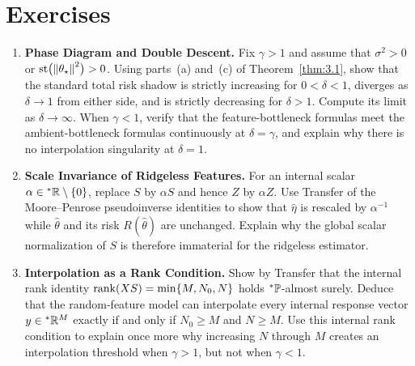 \section{Exercises}
\label{sec:3.4}

\begin{enumerate}
\item \textbf{Phase Diagram and Double Descent.} Fix $\gamma > 1$ and assume that $\sigma^2 > 0$ or $\operatorname{st}\bigl(\left\lVert \theta_\star \right\rVert^2\bigr) > 0$. Using parts~(a) and~(c) of Theorem~\ref{thm:3.1}, show that the standard total risk shadow is strictly increasing for $0 < \delta < 1$, diverges as $\delta \to 1$ from either side, and is strictly decreasing for $\delta > 1$. Compute its limit as $\delta \to \infty$. When $\gamma < 1$, verify that the feature-bottleneck formulas meet the ambient-bottleneck formulas continuously at $\delta = \gamma$, and explain why there is no interpolation singularity at $\delta = 1$.

\item \textbf{Scale Invariance of Ridgeless Features.} For an internal scalar $\alpha \in {}^*\mathbb{R} \setminus \{0\}$, replace $S$ by $\alpha S$ and hence $Z$ by $\alpha Z$. Use Transfer of the Moore--Penrose pseudoinverse identities to show that $\hat{\eta}$ is rescaled by $\alpha^{-1}$ while $\hat{\theta}$ and its risk $R(\hat{\theta})$ are unchanged. Explain why the global scalar normalization of $S$ is therefore immaterial for the ridgeless estimator.

\item \textbf{Interpolation as a Rank Condition.} Show by Transfer that the internal rank identity $\operatorname{rank}(XS) = \min\{M, N_0, N\}$ holds ${}^*\mathbb{P}$-almost surely. Deduce that the random-feature model can interpolate every internal response vector $y \in {}^*\mathbb{R}^M$ exactly if and only if $N_0 \ge M$ and $N \ge M$. Use this internal rank condition to explain once more why increasing $N$ through $M$ creates an interpolation threshold when $\gamma > 1$, but not when $\gamma < 1$.
\end{enumerate}
